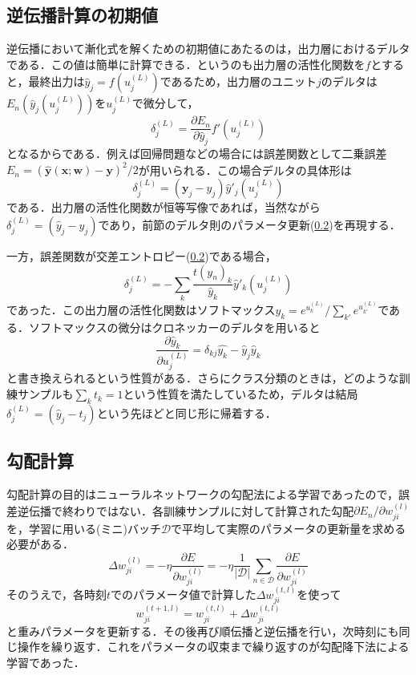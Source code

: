 \documentclass[a4paper,11pt]{jsreport}
\begin{document}
\subsection{逆伝播計算の初期値}
逆伝播において漸化式を解くための初期値にあたるのは，出力層におけるデルタである．この値は簡単に計算できる．というのも出力層の活性化関数を$f$とすると，最終出力は$\hat{y}_j=f(u_j^{(L)})$であるため，出力層のユニット$j$のデルタは$E_n(\hat{y}_j(u_j^{(L)}))$を$u_j^{(L)}$で微分して，
\begin{equation}
  \delta_j^{(L)}
  = \frac{\partial E_n}{\partial \hat{y}_j} f'(u_j^{(L)})
\end{equation}
となるからである．例えば回帰問題などの場合には誤差関数として二乗誤差$E_n=(\hat{\bm{y}}(\bm{x};\bm{w})-\bm{y})^2/2$が用いられる．この場合デルタの具体形は
\begin{equation}
  \delta_j^{(L)} = (\bm{y}_j - y_j)\hat{y}'_j (u_j^{(L)})
\end{equation}
である．出力層の活性化関数が恒等写像であれば，当然ながら$\delta_j^{(L)}=(\hat{y}_j-y_j)$であり，前節のデルタ則のパラメータ更新(\ref{})を再現する．\par
一方，誤差関数が交差エントロピー(\ref{})である場合，
\begin{equation}
  \delta_j^{(L)}
  = -\sum_k \frac{t(y_n)_k}{\hat{y}_k}\hat{y}'_k(u_j^{(L)})
\end{equation}
であった．この出力層の活性化関数はソフトマックス$y_k = e^{u_k^{(L)}}/\sum_{k'}e^{u_{k'}^{(L)}}$である．ソフトマックスの微分はクロネッカーのデルタを用いると
\begin{equation}
  \frac{\partial \hat{y}_k}{\partial u_j^{(L)}}
  = \delta_{kj} \hat{y_k} - \hat{y}_j \hat{y}_k
\end{equation}
と書き換えられるという性質がある．さらにクラス分類のときは，どのような訓練サンプルも$\sum_kt_k=1$という性質を満たしているため，デルタは結局$\delta_j^{(L)}=(\hat{y}_j - t_j)$という先ほどと同じ形に帰着する．

\subsection{勾配計算}
勾配計算の目的はニューラルネットワークの勾配法による学習であったので，誤差逆伝播で終わりではない．各訓練サンプルに対して計算された勾配$\partial E_n/\partial w_{ji}^{(l)}$を，学習に用いる(ミニ)バッチ$\mathcal{D}$で平均して実際のパラメータの更新量を求める必要がある．
\begin{equation}
  \Delta w_{ji}^{(l)}
  = -\eta \frac{\partial E}{\partial w_{ji}^{(l)}}
  = -\eta \frac{1}{|\mathcal{D}|} \sum_{n \in \mathcal{D}}\frac{\partial E}{\partial w_{ji}^{(l)}}
\end{equation}
そのうえで，各時刻$t$でのパラメータ値で計算した$\Delta w_{ji}^{(t,l)}$を使って
\begin{equation}
  w_{ji}^{(t+1,l)}
  = w_{ji}^{(t,l)} + \Delta w_{ji}^{(t,l)}
\end{equation}
と重みパラメータを更新する．その後再び順伝播と逆伝播を行い，次時刻にも同じ操作を繰り返す．これをパラメータの収束まで繰り返すのが勾配降下法による学習であった．
\end{document}
